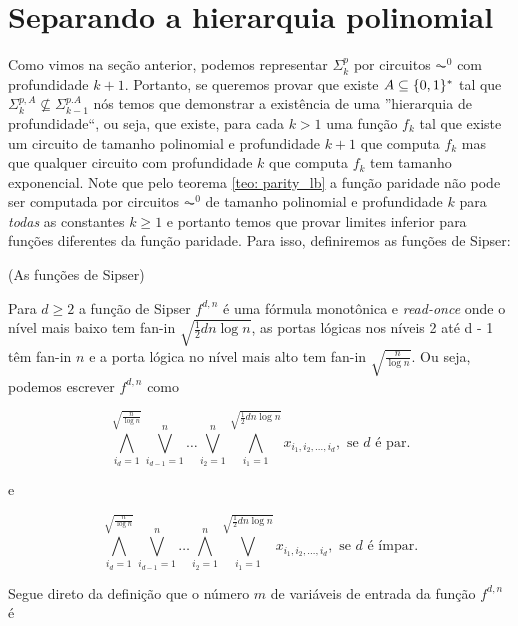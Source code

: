 \section{Separando a hierarquia polinomial}

Como vimos na seção anterior, podemos representar $\Sigma_{k}^{p}$ por circuitos $\AC^{0}$ com profundidade $k + 1$. Portanto, se queremos provar que existe $A \subseteq \{0, 1\}^{*}$ tal que $\Sigma_{k}^{p, A} \not\subseteq \Sigma_{k - 1}^{p. A}$ nós temos que demonstrar a existência de uma ''hierarquia de profundidade``, ou seja, que existe, para cada $k > 1$ uma função $f_{k}$ tal que existe um circuito de tamanho polinomial e profundidade $k + 1$ que computa $f_{k}$ mas que qualquer circuito com profundidade $k$ que computa $f_{k}$ tem tamanho exponencial. Note que pelo teorema \ref{teo: parity_lb} a função paridade não pode ser computada por circuitos $\AC^{0}$ de tamanho polinomial e profundidade $k$ para \emph{todas} as constantes $k \geq 1$ e portanto temos que provar limites inferior para funções diferentes da função paridade. Para isso, definiremos as funções de Sipser:

\begin{defi} (As funções de Sipser) \label{Sipser_f}

Para $d \geq 2$ a função de Sipser $f^{d, n}$ é uma fórmula monotônica e \emph{read-once} onde o nível mais baixo tem fan-in $\sqrt{\frac{1}{2}dn\log n}$, as portas lógicas nos níveis 2 até d - 1 têm fan-in $n$ e a porta lógica no nível mais alto tem fan-in $\sqrt{\frac{n}{\log n}}$. Ou seja, podemos escrever $f^{d, n}$ como

\begin{equation}
	\bigwedge_{i_{d}  = 1}^{\sqrt{\frac{n}{\log n}}}\bigvee_{i_{d - 1} = 1}^{n} \dots \bigvee_{i_{2} = 1}^{n} \bigwedge_{i_{1} = 1}^{\sqrt{\frac{1}{2}dn\log n}} x_{i_{1}, i_{2}, \dots, i_{d}}, \text{ se } d \text{ é par.}
\end{equation}

e

\begin{equation}
	\bigwedge_{i_{d}  = 1}^{\sqrt{\frac{n}{\log n}}}\bigvee_{i_{d - 1} = 1}^{n} \dots \bigwedge_{i_{2} = 1}^{n} \bigvee_{i_{1} = 1}^{\sqrt{\frac{1}{2}dn\log n}} x_{i_{1}, i_{2}, \dots, i_{d}}, \text{ se } d \text{ é ímpar.}
\end{equation}

\end{defi}

Segue direto da definição que o número $m$ de variáveis de entrada da função $f^{d, n}$ é

